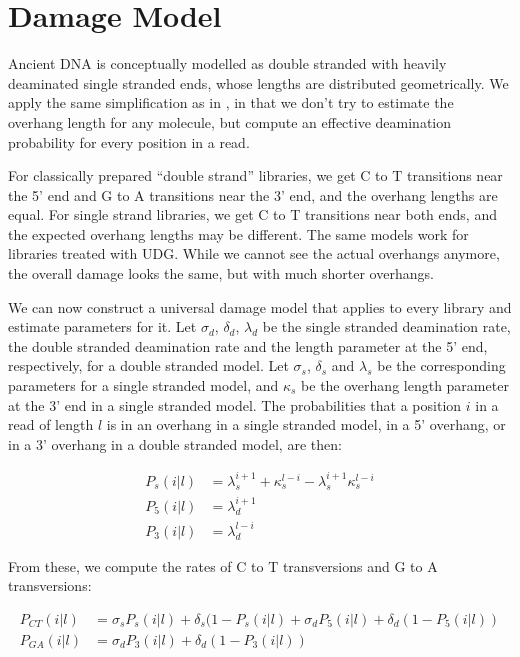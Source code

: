 \documentclass{article}
\begin{document}
\section{Damage Model}

Ancient DNA is conceptually modelled as double stranded with heavily
deaminated single stranded ends, whose lengths are distributed
geometrically.  We apply the same simplification as in \cite{mapdamage},
in that we don't try to estimate the overhang length for any molecule,
but compute an effective deamination probability for every position in a
read.

For classically prepared ``double strand'' libraries, we get C to T
transitions near the 5' end and G to A transitions near the 3' end, and
the overhang lengths are equal.  For single strand libraries, we get C
to T transitions near both ends, and the expected overhang lengths may
be different.  The same models work for libraries treated with UDG.
While we cannot see the actual overhangs anymore, the overall damage
looks the same, but with much shorter overhangs.

We can now construct a universal damage model that applies to every
library and estimate parameters for it.  Let $\sigma_d$, $\delta_d$,
$\lambda_d$ be the single stranded deamination rate, the double
stranded deamination rate and the length parameter at the 5' end,
respectively, for a double stranded model.  Let $\sigma_s$, $\delta_s$
and $\lambda_s$ be the corresponding parameters for a single stranded
model, and $\kappa_s$ be the overhang length parameter at the 3' end in
a single stranded model.  The probabilities that a position $i$ in a
read of length $l$ is in an overhang in a single stranded model, in a 5'
overhang, or in a 3' overhang in a double stranded model, are then:

\begin{align*}
P_s(i|l) &= \lambda_s^{i+1} + \kappa_s^{l-i} - \lambda_s^{i+1} \kappa_s^{l-i} \\
P_5(i|l) &= \lambda_d^{i+1} \\
P_3(i|l) &= \lambda_d^{l-i}
\end{align*}

From these, we compute the rates of C to T transversions and G to A transversions:

\begin{align*}
P_{CT}(i|l) &= \sigma_s P_s(i|l) + \delta_s (1-P_s(i|l) + \sigma_d P_5(i|l) + \delta_d (1-P_5(i|l)) \\
P_{GA}(i|l) &= \sigma_d P_3(i|l) + \delta_d (1-P_3(i|l))
\end{align*}
\end{document}
